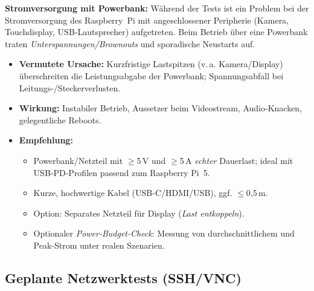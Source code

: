 \textbf{Stromversorgung mit Powerbank:} Während der Tests ist ein Problem bei der Stromversorgung des Raspberry~Pi mit angeschlossener Peripherie (Kamera, Touchdisplay, USB‑Lautsprecher) aufgetreten. Beim Betrieb über eine Powerbank traten \textit{Unterspannungen/Brownouts} und sporadische Neustarts auf.
\begin{itemize}
	\item \textbf{Vermutete Ursache:} Kurzfristige Lastspitzen (v.\,a. Kamera/Display) überschreiten die Leistungsabgabe der Powerbank; Spannungsabfall bei Leitungs-/Steckerverlusten.
	\item \textbf{Wirkung:} Instabiler Betrieb, Aussetzer beim Videostream, Audio‑Knacken, gelegentliche Reboots.
	\item \textbf{Empfehlung:}
	\begin{itemize}
		\item Powerbank/Netzteil mit \(\geq\)5\,V und \(\geq\)5\,A \textit{echter} Dauerlast; ideal mit USB‑PD‑Profilen passend zum Raspberry Pi~5.
		\item Kurze, hochwertige Kabel (USB‑C/HDMI/USB), ggf. \(\leq\)0{,}5\,m.
		\item Option: Separates Netzteil für Display (\emph{Last entkoppeln}).
		\item Optionaler \emph{Power‑Budget‑Check}: Messung von durchschnittlichem und Peak‑Strom unter realen Szenarien.
	\end{itemize}
\end{itemize}

\subsection{Geplante Netzwerktests (SSH/VNC)}
\label{cha:Geplante Netzwerktests (SSH/VNC)}

